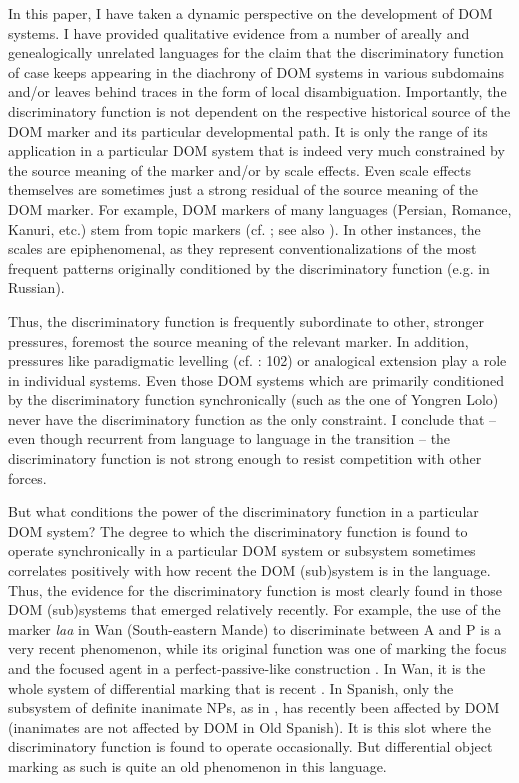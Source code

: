 \documentclass[output=paper]{langsci/langscibook}
\begin{document}
In this paper, I have taken a dynamic perspective on the development of DOM systems. I have provided qualitative evidence from a number of areally and genealogically unrelated languages for the claim that the discriminatory function of case keeps appearing in the diachrony of DOM systems in various subdomains and/or leaves behind traces in the form of local disambiguation. Importantly, the discriminatory function is not dependent on the respective historical source of the DOM marker and its particular developmental path. It is only the range of its application in a particular DOM system that is indeed very much constrained by the source meaning of the marker and/or by scale effects. Even scale effects themselves are sometimes just a strong residual of the source meaning of the DOM marker. For example, DOM markers of many languages (Persian, Romance, Kanuri, etc.) stem from topic markers (cf. \citealt{Iemmolo2010,DalrympleNikolaeva2011}; see also ). In other instances, the scales are epiphenomenal, as they represent conventionalizations of the most frequent patterns originally conditioned by the discriminatory function (e.g. in Russian).

Thus, the discriminatory function is frequently subordinate to other, stronger pressures, foremost the source meaning of the relevant marker. In addition, pressures like paradigmatic levelling (cf. \citealt{Jäger2007}: 102) or analogical extension play a role in individual systems. Even those DOM systems which are primarily conditioned by the discriminatory function synchronically (such as the one of Yongren Lolo) never have the discriminatory function as the only constraint. I conclude that – even though recurrent from language to language in the transition – the discriminatory function is not strong enough to resist competition with other \largerpage forces. 

But what conditions the power of the discriminatory function in a particular DOM system? The degree to which the discriminatory function is found to operate synchronically in a particular DOM system or subsystem sometimes correlates positively with how recent the DOM (sub)system is in the language. Thus, the evidence for the discriminatory function is most clearly found in those DOM (sub)systems that emerged relatively recently. For example, the use of the marker \textit{laa} in Wan (South-eastern Mande) to discriminate between A and P is a very recent phenomenon, while its original function was one of marking the focus and the focused agent in a perfect-passive-like construction \citep{Nikitina2018}. In Wan, it is the whole system of differential marking that is recent \citep{Nikitina2018}. In Spanish, only the subsystem of definite inanimate NPs, as in , has recently been affected by DOM (inanimates are not affected by DOM in Old Spanish). It is this slot where the discriminatory function is found to operate occasionally. But differential object marking as such is quite an old phenomenon in this language.
\end{document}
